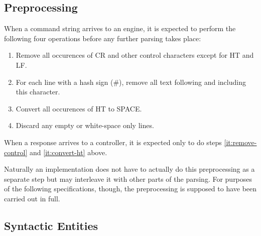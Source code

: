 \documentclass[a4paper]{article}
\begin{document}
\subsection{Preprocessing}
\label{sec:preprocessing}

When a command string arrives to an engine, it is expected to perform
the following four operations before any further parsing takes place:
\begin{enumerate}
\item \label{it:remove-control} Remove all occurences of CR and other
  control characters except for HT and LF.
\item For each line with a hash sign (\#), remove all text following and
  including this character.
\item \label{it:convert-ht} Convert all occurences of HT to SPACE.
\item Discard any empty or white-space only lines.
\end{enumerate}

When a response arrives to a controller, it is expected only to do steps
\ref{it:remove-control} and \ref{it:convert-ht} above.

Naturally an implementation does not have to actually do this
preprocessing as a separate step but may interleave it with other
parts of the parsing. For purposes of the following specifications,
though, the preprocessing is supposed to have been carried out in
full.

\subsection{Syntactic Entities}
\end{document}

